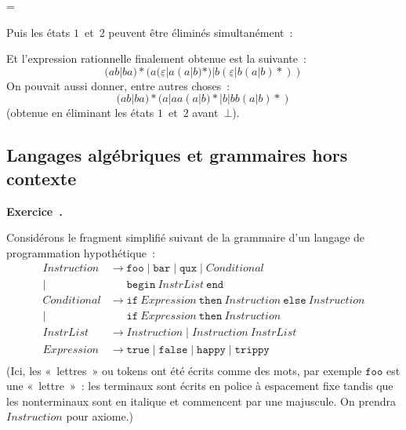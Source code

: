 \documentclass[12pt,a4paper]{article}
\theoremstyle{definition}
\newcommand\exercice{%
\refstepcounter{comcnt}\bigskip\noindent\textbf{Exercice~\thecomcnt.}}
\newif\ifcorrige
\newenvironment{corrige}%
{\ifcorrige\relax\else\setbox0=\vbox\bgroup\fi%
\smallbreak\footnotesize\noindent{\underbar{\textit{Corrigé.}}\quad}}
{{\hbox{}\nobreak\hfill\checkmark}%
\ifcorrige\relax\else\egroup\fi\par}
\begin{document}
\begin{corrige}
\begin{center}
\begin{tikzpicture}[>=latex,line join=bevel,automaton]
\end{tikzpicture}
\end{center}
Puis les états $1$ et $2$ peuvent être éliminés simultanément :
\begin{center}
\end{center}
Et l'expression rationnelle finalement obtenue est la suivante :
\[
(ab|ba){*}(a(\underline{\varepsilon}|a(a|b){*})|b(\underline{\varepsilon}|b(a|b){*}))
\]
On pouvait aussi donner, entre autres choses :
\[
(ab|ba){*}(a|aa(a|b){*}|b|bb(a|b){*})
\]
(obtenue en éliminant les états $1$ et $2$ avant $\bot$).
\end{corrige}

%
%
%

\subsection{Langages algébriques et grammaires hors contexte}

\exercice

Considérons le fragment simplifié suivant de la grammaire d'un langage
de programmation hypothétique :
\[
\begin{aligned}
\mathit{Instruction} &\rightarrow \mathtt{foo} \;|\; \mathtt{bar} \;|\; \mathtt{qux} \;|\; \mathit{Conditional}\\
|&\phantom{\rightarrow} \mathtt{begin}\ \mathit{InstrList}\ \mathtt{end}\\
\mathit{Conditional} &\rightarrow \mathtt{if}\ \mathit{Expression}\ \mathtt{then}\ \mathit{Instruction}\ \mathtt{else}\ \mathit{Instruction}\\
|&\phantom{\rightarrow} \mathtt{if}\ \mathit{Expression}\ \mathtt{then}\ \mathit{Instruction}\\
\mathit{InstrList} &\rightarrow \mathit{Instruction} \;|\; \mathit{Instruction}\ \mathit{InstrList}\\
\mathit{Expression} &\rightarrow \mathtt{true} \;|\; \mathtt{false} \;|\; \mathtt{happy} \;|\; \mathtt{trippy}\\
\end{aligned}
\]
(Ici, les « lettres » ou tokens ont été écrits comme des mots, par
exemple $\mathtt{foo}$ est une « lettre » : les terminaux sont écrits
en police à espacement fixe tandis que les nonterminaux sont en
italique et commencent par une majuscule.  On prendra
$\mathit{Instruction}$ pour axiome.)
\end{document}
